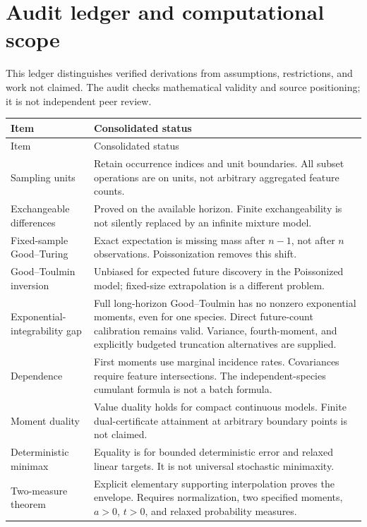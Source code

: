 \documentclass[11pt]{article}
\numberwithin{equation}{section}
\theoremstyle{definition}
\theoremstyle{remark}
\begin{document}
\section{Audit ledger and computational scope}\label{app:audit}
This ledger distinguishes verified derivations from assumptions, restrictions, and work not claimed. The audit checks mathematical validity and source positioning; it is not independent peer review.

\begin{longtable}{@{}>{\raggedright\arraybackslash}p{}>{\raggedright\arraybackslash}p{}@{}}
\toprule
Item & Consolidated status\\
\midrule
\endfirsthead
\toprule Item & Consolidated status\\\midrule\endhead
\bottomrule\endfoot
Sampling units & Retain occurrence indices and unit boundaries. All subset operations are on units, not arbitrary aggregated feature counts.\\[4pt]
Exchangeable differences & Proved on the available horizon. Finite exchangeability is not silently replaced by an infinite mixture model.\\[4pt]
Fixed-sample Good--Turing & Exact expectation is missing mass after $n-1$, not after $n$ observations. Poissonization removes this shift.\\[4pt]
Good--Toulmin inversion & Unbiased for expected future discovery in the Poissonized model; fixed-size extrapolation is a different problem.\\[4pt]
Exponential-integrability gap & Full long-horizon Good--Toulmin has no nonzero exponential moments, even for one species. Direct future-count calibration remains valid. Variance, fourth-moment, and explicitly budgeted truncation alternatives are supplied.\\[4pt]
Dependence & First moments use marginal incidence rates. Covariances require feature intersections. The independent-species cumulant formula is not a batch formula.\\[4pt]
Moment duality & Value duality holds for compact continuous models. Finite dual-certificate attainment at arbitrary boundary points is not claimed.\\[4pt]
Deterministic minimax & Equality is for bounded deterministic error and relaxed linear targets. It is not universal stochastic minimaxity.\\[4pt]
Two-measure theorem & Explicit elementary supporting interpolation proves the envelope. Requires normalization, two specified moments, $a>0$, $t>0$, and relaxed probability measures.\\[4pt]

\end{longtable}
\end{document}
